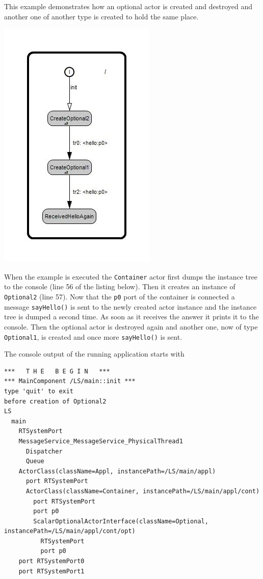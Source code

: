This example demonstrates how an optional actor is created and destroyed and another one of another type
is created to hold the same place.

\includegraphics[scale=0.7]{images/039-DynAct1-Container_behavior.jpg}

When the example is executed the \texttt{Container} actor first dumps the instance tree to the console
(line 56 of the listing below).
Then it creates an instance of \texttt{Optional2} (line 57). Now that the \texttt{p0} port
of the container is connected a message \texttt{sayHello()} is sent to the newly created actor instance
and the instance tree is dumped a second time.
As soon as it receives the answer it prints it to the console. Then the optional actor is destroyed again
and another one, now of type \texttt{Optional1}, is created and once more \texttt{sayHello()} is sent.



The console output of the running application starts with

\begin{verbatim}
***   T H E   B E G I N   ***
*** MainComponent /LS/main::init ***
type 'quit' to exit
before creation of Optional2
LS
  main
    RTSystemPort
    MessageService_MessageService_PhysicalThread1
      Dispatcher
      Queue
    ActorClass(className=Appl, instancePath=/LS/main/appl)
      port RTSystemPort
      ActorClass(className=Container, instancePath=/LS/main/appl/cont)
        port RTSystemPort
        port p0
        ScalarOptionalActorInterface(className=Optional, instancePath=/LS/main/appl/cont/opt)
          RTSystemPort
          port p0
    port RTSystemPort0
    port RTSystemPort1
\end{verbatim}

